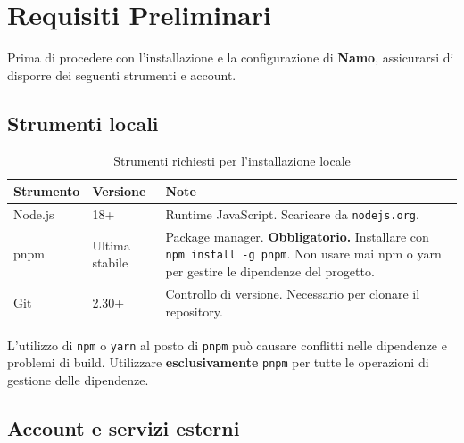 \documentclass[a4paper,11pt,oneside]{book}
\newcommand{\namo}{\textbf{Namo}}
\begin{document}
\section{Requisiti Preliminari}
\label{sec:requisiti-preliminari}

Prima di procedere con l'installazione e la configurazione di \namo{}, assicurarsi di disporre dei seguenti strumenti e account.

\subsection{Strumenti locali}

\begin{table}[htbp]
\centering
\caption{Strumenti richiesti per l'installazione locale}
\label{tab:requisiti-strumenti}
\begin{tabularx}{\textwidth}{l l X}
\toprule
\textbf{Strumento} & \textbf{Versione} & \textbf{Note} \\
\midrule
Node.js      & 18+             & Runtime JavaScript. Scaricare da \texttt{nodejs.org}. \\
pnpm         & Ultima stabile  & Package manager. \textbf{Obbligatorio.} Installare con \texttt{npm install -g pnpm}. Non usare mai npm o yarn per gestire le dipendenze del progetto. \\
Git          & 2.30+           & Controllo di versione. Necessario per clonare il repository. \\
\bottomrule
\end{tabularx}
\end{table}

\begin{dangerbox}
L'utilizzo di \texttt{npm} o \texttt{yarn} al posto di \texttt{pnpm} pu\`o causare conflitti nelle dipendenze e problemi di build. Utilizzare \textbf{esclusivamente} \texttt{pnpm} per tutte le operazioni di gestione delle dipendenze.
\end{dangerbox}

\subsection{Account e servizi esterni}
\end{document}
